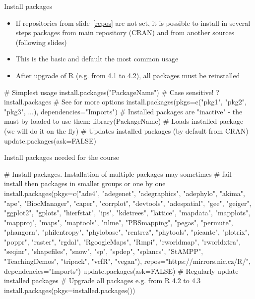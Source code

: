 \documentclass[compress, xelatex, 11pt, xcolor=svgnames, aspectratio=169,
	hyperref={
		bookmarks=true,
		unicode=true,
		colorlinks=true,
		pdftitle={Molecular data in R},
		plainpages=false,
		pdfauthor={Vojtech Zeisek},
		pdfsubject={Course about phylogeny and evolution in R},
		pdfcreator={XeLaTeX},
		pdfkeywords={R, evolution, phylogeny, molecular data},
		linkcolor=Crimson, %
		anchorcolor=Magenta, %
		citecolor=Magenta, %
		filecolor=Magenta, %
		menucolor=Magenta, %
		urlcolor=DodgerBlue, %
		},
	url={hyphens, lowtilde} %
	]{beamer}
\begin{document}
\begin{frame}[fragile]{Install packages}
	\begin{itemize}
		\item If repositories from slide~\ref{repos} are not set, it is possible to install in several steps packages from main repository (CRAN) and from another sources (following slides)
		\item This is the basic and default the most common usage
		\item After upgrade of R (e.g. from 4.1 to 4.2), all packages must be reinstalled
	\end{itemize}
	\begin{spluscode}
    # Simplest usage
    install.packages("PackageName") # Case sensitive!
    ?install.packages # See for more options
    install.packages(pkgs=c("pkg1", "pkg2", "pkg3", ...),
      dependencies="Imports")
    # Installed packages are "inactive" - the must by loaded to use them:
    library(PackageName) # Loads installed package (we will do it on the fly)
    # Updates installed packages (by default from CRAN)
    update.packages(ask=FALSE)
	\end{spluscode}
\end{frame}

\begin{frame}[fragile]{Install packages needed for the course}
	\begin{spluscode}
    # Install packages. Installation of multiple packages may sometimes
    # fail - install then packages in smaller groups or one by one
    install.packages(pkgs=c("ade4", "adegenet", "adegraphics", "adephylo",
      "akima", "ape", "BiocManager", "caper", "corrplot", "devtools",
      "adespatial", "gee", "geiger", "ggplot2", "gplots", "hierfstat", "ips",
      "kdetrees", "lattice", "mapdata", "mapplots", "mapproj", "maps",
      "maptools", "nlme", "PBSmapping", "pegas", "permute", "phangorn",
      "philentropy", "phylobase", "rentrez", "phytools", "picante", "plotrix",
      "poppr", "raster", "rgdal", "RgoogleMaps", "Rmpi", "rworldmap",
      "rworldxtra", "seqinr", "shapefiles", "snow", "sp", "spdep", "splancs",
      "StAMPP", "TeachingDemos", "tripack", "vcfR", "vegan"),
      repos="https://mirrors.nic.cz/R/", dependencies="Imports")
    update.packages(ask=FALSE) # Regularly update installed packages
    # Upgrade all packages e.g. from R 4.2 to 4.3
    install.packages(pkgs=installed.packages())
	\end{spluscode}
\end{frame}
\end{document}

